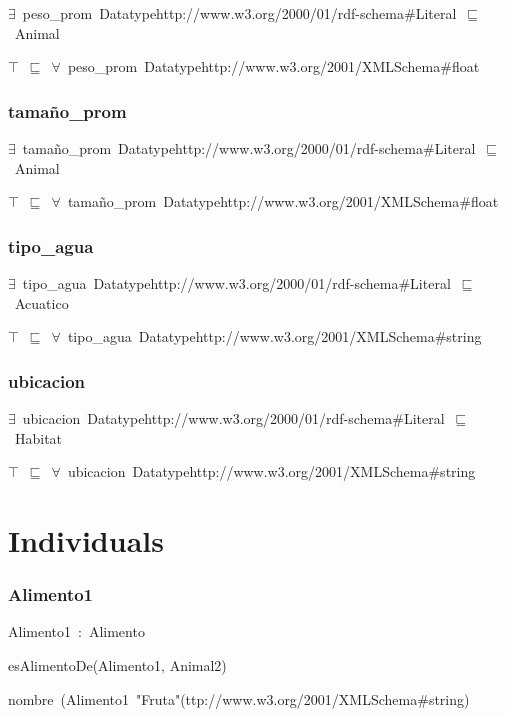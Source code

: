 \ensuremath{\exists}~peso\_prom~Datatypehttp://www.w3.org/2000/01/rdf-schema\#Literal~\ensuremath{\sqsubseteq}~Animal

\ensuremath{\top}~\ensuremath{\sqsubseteq}~\ensuremath{\forall}~peso\_prom~Datatypehttp://www.w3.org/2001/XMLSchema\#float

\subsubsection*{tamaño\_prom}

\ensuremath{\exists}~tamaño\_prom~Datatypehttp://www.w3.org/2000/01/rdf-schema\#Literal~\ensuremath{\sqsubseteq}~Animal

\ensuremath{\top}~\ensuremath{\sqsubseteq}~\ensuremath{\forall}~tamaño\_prom~Datatypehttp://www.w3.org/2001/XMLSchema\#float

\subsubsection*{tipo\_agua}

\ensuremath{\exists}~tipo\_agua~Datatypehttp://www.w3.org/2000/01/rdf-schema\#Literal~\ensuremath{\sqsubseteq}~Acuatico

\ensuremath{\top}~\ensuremath{\sqsubseteq}~\ensuremath{\forall}~tipo\_agua~Datatypehttp://www.w3.org/2001/XMLSchema\#string

\subsubsection*{ubicacion}

\ensuremath{\exists}~ubicacion~Datatypehttp://www.w3.org/2000/01/rdf-schema\#Literal~\ensuremath{\sqsubseteq}~Habitat

\ensuremath{\top}~\ensuremath{\sqsubseteq}~\ensuremath{\forall}~ubicacion~Datatypehttp://www.w3.org/2001/XMLSchema\#string

\section*{Individuals}\subsubsection*{Alimento1}

Alimento1~:~Alimento

esAlimentoDe(Alimento1, Animal2)

nombre~(Alimento1~"Fruta"^^http://www.w3.org/2001/XMLSchema\#string)

